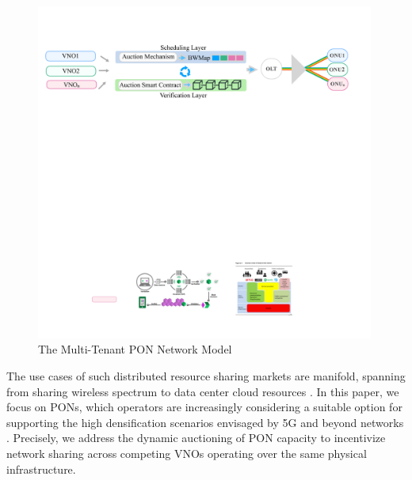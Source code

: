 \begin{figure}[htbp]
  \centering
  \includegraphics[width=0.99\textwidth]{Figures/ICBC-model.pdf}
\caption{The Multi-Tenant \ac{PON} Network Model }
\label{Fig_model}
\end{figure}
The use cases of such distributed resource sharing markets are manifold, spanning from sharing wireless spectrum \cite{7194843} to data center cloud resources \cite{7296648}. In this paper, we focus on \acp{PON}, which operators are increasingly considering a suitable option for supporting the high densification scenarios envisaged by 5G and beyond networks \cite{6886953}.
Precisely, we address the dynamic auctioning of \ac{PON} capacity to incentivize network sharing across competing \acp{VNO} operating over the same physical infrastructure.


